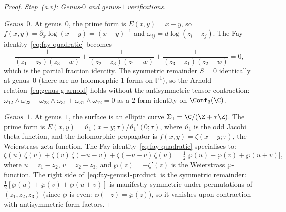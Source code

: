 \begin{proof}
\medskip
\emph{Step~(a.v): Genus-$0$ and genus-$1$ verifications.}

\noindent\emph{Genus~$0$.}
At genus~$0$, the prime form is $E(x,y) = x - y$, so
$f(x,y) = \partial_x \log(x-y) = (x-y)^{-1}$ and
$\omega_{ij} = d\log(z_i - z_j)$. The Fay
identity~\eqref{eq:fay-quadratic} becomes
\[
 \frac{1}{(z_1 - z_2)(z_3 - w)}
 + \frac{1}{(z_2 - z_3)(z_1 - w)}
 + \frac{1}{(z_3 - z_1)(z_2 - w)} = 0,
\]
which is the partial fraction identity. The symmetric
remainder $S = 0$ identically at genus~$0$ (there are no
holomorphic $1$-forms on $\mathbb{P}^1$), so the Arnold
relation~\eqref{eq:genus-g-arnold} holds without the
antisymmetric-tensor contraction:
$\omega_{12} \wedge \omega_{23}
+ \omega_{23} \wedge \omega_{31}
+ \omega_{31} \wedge \omega_{12} = 0$
as a $2$-form identity on $\Conf_3(\C)$.

\noindent\emph{Genus~$1$.}
At genus~$1$, the surface is an elliptic curve
$\Sigma_1 = \C/(\Z + \tau\Z)$. The prime form is
$E(x,y) = \vartheta_1(x-y; \tau) / \vartheta_1'(0;\tau)$,
where $\vartheta_1$ is the odd Jacobi theta function, and
the holomorphic propagator is
$f(x,y) = \zeta(x - y; \tau)$, the Weierstrass zeta function.
The Fay identity~\eqref{eq:fay-quadratic} specialises to:
\begin{equation}\label{eq:fay-genus1-product}
 \zeta(u)\,\zeta(v)
 + \zeta(v)\,\zeta(-u-v)
 + \zeta(-u-v)\,\zeta(u)
 = \tfrac{1}{2}\bigl[\wp(u) + \wp(v) + \wp(u+v)\bigr],
\end{equation}
where $u = z_1 - z_2$, $v = z_2 - z_3$, and
$\wp(z) = -\zeta'(z)$ is the Weierstrass $\wp$-function.
The right side of~\eqref{eq:fay-genus1-product} is the
symmetric remainder: $\tfrac{1}{2}[\wp(u) + \wp(v) + \wp(u+v)]$
is manifestly symmetric under permutations of
$(z_1, z_2, z_3)$ (since $\wp$ is even: $\wp(-z) = \wp(z)$),
so it vanishes upon contraction with antisymmetric form factors.


\end{proof}
